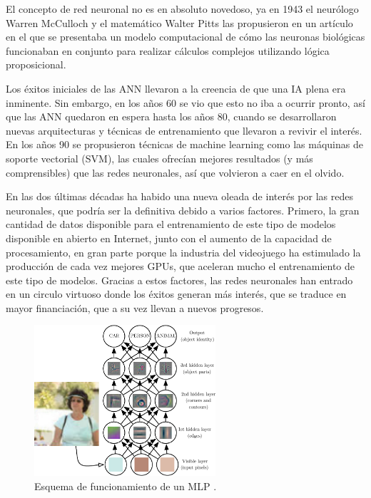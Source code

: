 El concepto de red neuronal no es en absoluto novedoso, ya en 1943 el neurólogo Warren McCulloch y el matemático Walter Pitts las propusieron en un artículo \cite{art:mcculloch1943logical} en el que se presentaba un modelo computacional de cómo las neuronas biológicas funcionaban en conjunto para realizar cálculos complejos utilizando lógica proposicional.

Los éxitos iniciales de las ANN llevaron a la creencia de que una IA plena era inminente. Sin embargo, en los años 60 se vio que esto no iba a ocurrir pronto, así que las ANN quedaron en espera hasta los años 80, cuando se desarrollaron nuevas arquitecturas y técnicas de entrenamiento que llevaron a revivir el interés. En los años 90 se propusieron técnicas de machine learning como las máquinas de soporte vectorial (SVM), las cuales ofrecían mejores resultados (y más comprensibles) que las redes neuronales, así que volvieron a caer en el olvido.

En las dos últimas décadas ha habido una nueva oleada de interés por las redes neuronales, que podría ser la definitiva debido a varios factores. Primero, la gran cantidad de datos disponible para el entrenamiento de este tipo de modelos disponible en abierto en Internet, junto con el aumento de la capacidad de procesamiento, en gran parte porque la industria del videojuego ha estimulado la producción de cada vez mejores GPUs, que aceleran mucho el entrenamiento de este tipo de modelos. Gracias a estos factores, las redes neuronales han entrado en un circulo virtuoso donde los éxitos generan más interés, que se traduce en mayor financiación, que a su vez llevan a nuevos progresos.

\begin{figure}[H]
  \centering
  \includegraphics[width=0.6\textwidth]{images/mlp}
  \caption{Esquema de funcionamiento de un MLP \cite{book:Goodfellow-et-al-2016}.}
  \label{fig:mlp}
\end{figure}

